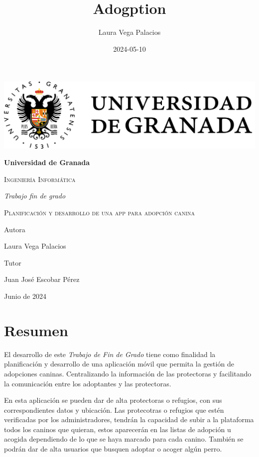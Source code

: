 \documentclass[a4paper, 12pt]{article}
\title{Adogption}
\date{2024-05-10}
\author{Laura Vega Palacios}
\begin{document}
\begin{titlepage}
	\pagestyle{plain}
	\centering
	{\includegraphics[width=1\textwidth]{logoUGR.png}\par}
	{\bfseries\LARGE Universidad de Granada \par}
	{\scshape\Large Ingeniería Informática \par}
	\vspace{0.5cm}
	{\itshape\Large Trabajo fin de grado \par}
	{\scshape\Huge Planificación y desarrollo de una app para adopción canina \par}
	\vfill
	{\Large Autora \par}
	{\Large Laura Vega Palacios\par}

	{\Large Tutor \par}
	{\Large Juan José Escobar Pérez\par}
	\vfill
	{\Large Junio de 2024 \par}
\end{titlepage} 

\newpage
\thispagestyle{empty}
\mbox{}

\newpage
\pagestyle{plain}
\section*{Resumen}
El desarrollo de este \textit{Trabajo de Fin de Grado} tiene como finalidad la planificación y desarrollo de una aplicación móvil que permita la gestión de adopciones caninas. Centralizando la información de las protectoras y facilitando la comunicación entre los adoptantes y las protectoras.

En esta aplicación se pueden dar de alta protectoras o refugios, con sus correspondientes datos y ubicación. Las protecotras o refugios que estén verificadas por los administradores, tendrán la capacidad de subir a la plataforma todos los caninos que quieran, estos aparecerán en las listas de adopción u acogida dependiendo de lo que se haya marcado para cada canino. También se podrán dar de alta usuarios que busquen adoptar o acoger algún perro.  
\end{document}
